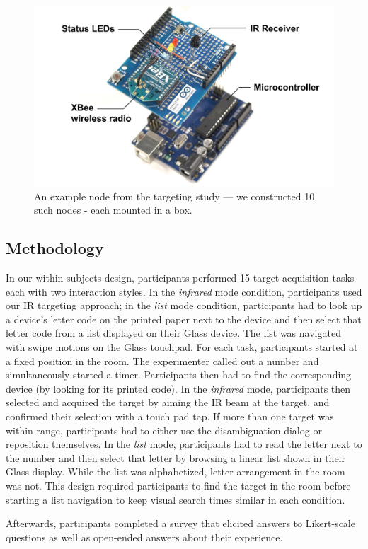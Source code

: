 \begin{figure}[b]
\centering
\includegraphics[width=0.8\columnwidth]{figures/study-node.pdf}
\caption{An example node from the targeting study --- we constructed 10 such nodes - each mounted in a box.}
\label{fig:target}
\end{figure}

\subsection{Methodology}
In our within-subjects design, participants performed 15 target acquisition tasks each with two interaction styles. In the {\em infrared} mode condition, participants used our IR targeting approach; in the {\em list} mode condition, participants had to look up a device's letter code on the printed paper next to the device and then select that letter code from a list displayed on their Glass device. The list was navigated with swipe motions on the Glass touchpad. For each task, participants started at a fixed position in the room. The experimenter called out a number and simultaneously started a timer. Participants then had to find the corresponding device (by looking for its printed code). In the {\em infrared} mode, participants then selected and acquired the target by aiming the IR beam at the target, and confirmed their selection with a touch pad tap. If more than one target was within range, participants had to either use the disambiguation dialog or reposition themselves. In the {\em list} mode, participants had to read the letter next to the number and then select that letter by browsing a linear list shown in their Glass display. While the list was alphabetized, letter arrangement in the room was not. This design required participants to find the target in the room before starting a list navigation to keep visual search times similar in each condition.

Afterwards, participants completed a survey that elicited answers to Likert-scale questions as well as open-ended answers about their experience.

